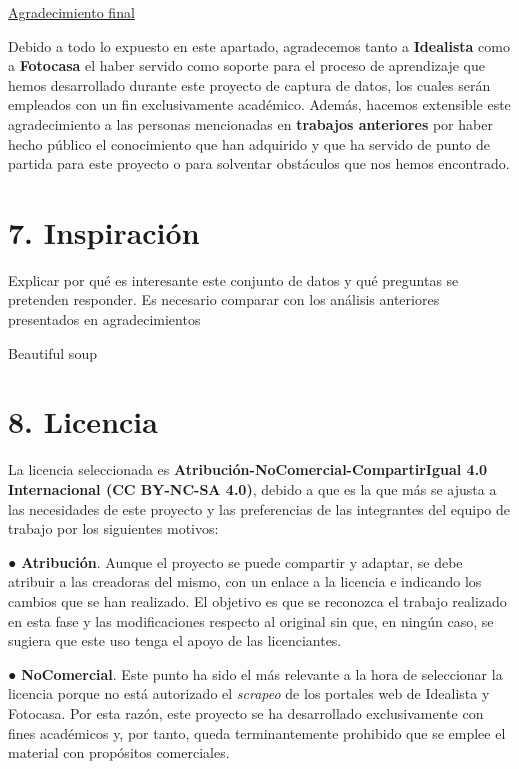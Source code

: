 \documentclass[12pt]{article}
\begin{document}
 \underline{Agradecimiento final}
 
Debido a todo lo expuesto en este apartado, agradecemos tanto a \textbf{Idealista} como a \textbf{Fotocasa} el haber servido como soporte para el proceso de aprendizaje que hemos desarrollado durante este proyecto de captura de datos, los cuales serán empleados con un fin exclusivamente académico. Además, hacemos extensible este agradecimiento a las personas mencionadas en \textbf{trabajos anteriores} por haber hecho público el conocimiento que han adquirido y que ha servido de punto de partida para este proyecto o para solventar obstáculos que nos hemos encontrado. 

\section*{7. Inspiración }\vspace{-1.5em}

Explicar por qué es interesante este conjunto de datos y qué
preguntas se pretenden responder. Es necesario comparar con los análisis
anteriores presentados en agradecimientos

Beautiful soup

\section*{8. Licencia }\vspace{-1.5em}

La licencia seleccionada es\textbf{ Atribución-NoComercial-CompartirIgual 4.0 Internacional (CC BY-NC-SA 4.0)}, debido a que es la que más se ajusta a las necesidades de este proyecto y las preferencias de las integrantes del equipo de trabajo por los siguientes motivos:

● \textbf{Atribución}. Aunque el proyecto se puede compartir y adaptar, se debe atribuir a las creadoras del mismo, con un enlace a la licencia e indicando los cambios que se han realizado. El objetivo es que se reconozca el trabajo realizado en esta fase y las modificaciones respecto al original sin que, en ningún caso, se sugiera que este uso tenga el apoyo de las licenciantes.  

● \textbf{NoComercial}. Este punto ha sido el más relevante a la hora de seleccionar la licencia porque no está autorizado el \textit{scrapeo} de los portales web de Idealista y Fotocasa. Por esta razón, este proyecto se ha desarrollado exclusivamente con fines académicos y, por tanto, queda terminantemente prohibido que se emplee el material con propósitos comerciales. 
\end{document}
